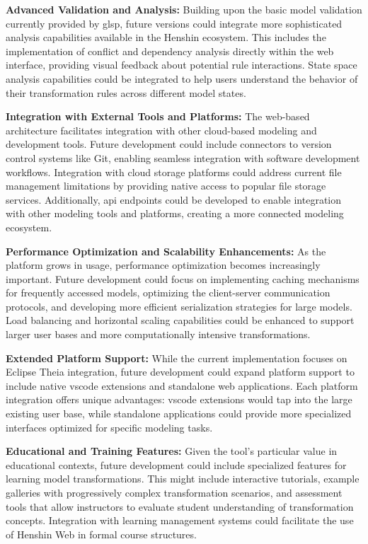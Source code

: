   \textbf{Advanced Validation and Analysis:} Building upon the basic model validation currently provided by \ac{glsp}, future versions could integrate more sophisticated analysis capabilities available in the Henshin ecosystem. This includes the implementation of conflict and dependency analysis directly within the web interface, providing visual feedback about potential rule interactions. State space analysis capabilities could be integrated to help users understand the behavior of their transformation rules across different model states.

  \textbf{Integration with External Tools and Platforms:} The web-based architecture facilitates integration with other cloud-based modeling and development tools. Future development could include connectors to version control systems like Git, enabling seamless integration with software development workflows. Integration with cloud storage platforms could address current file management limitations by providing native access to popular file storage services. Additionally, \ac{api} endpoints could be developed to enable integration with other modeling tools and platforms, creating a more connected modeling ecosystem.

  \textbf{Performance Optimization and Scalability Enhancements:} As the platform grows in usage, performance optimization becomes increasingly important. Future development could focus on implementing caching mechanisms for frequently accessed models, optimizing the client-server communication protocols, and developing more efficient serialization strategies for large models. Load balancing and horizontal scaling capabilities could be enhanced to support larger user bases and more computationally intensive transformations.

  \textbf{Extended Platform Support:} While the current implementation focuses on Eclipse Theia integration, future development could expand platform support to include native \ac{vscode} extensions and standalone web applications. Each platform integration offers unique advantages: \ac{vscode} extensions would tap into the large existing user base, while standalone applications could provide more specialized interfaces optimized for specific modeling tasks.

  \textbf{Educational and Training Features:} Given the tool's particular value in educational contexts, future development could include specialized features for learning model transformations. This might include interactive tutorials, example galleries with progressively complex transformation scenarios, and assessment tools that allow instructors to evaluate student understanding of transformation concepts. Integration with learning management systems could facilitate the use of Henshin Web in formal course structures.

